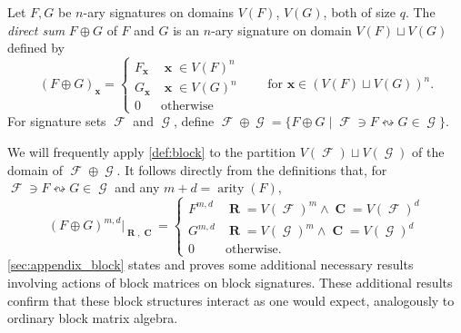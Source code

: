\documentclass{article}
\DeclareMathOperator{\arity}{arity}
\DeclareMathOperator{\vx}{\mathbf{x}}
\DeclareMathOperator{\vr}{\mathbf{R}}
\DeclareMathOperator{\vc}{\mathbf{C}}
\DeclareMathOperator{\fc}{\mathcal{F}}
\DeclareMathOperator{\gc}{\mathcal{G}}
\begin{document}
\begin{definition}[$\oplus$]
\label{def:oplus-f-g}
    Let $F,G$ be $n$-ary signatures on domains $V(F)$, $V(G)$, both of size $q$.
    The \emph{direct sum} $F \oplus G$ of $F$ and $G$ is an
    $n$-ary signature on domain $V(F) \sqcup V(G)$ defined by
    \[
        (F \oplus G)_{\vx} = \begin{cases} 
            F_{\vx} & \vx \in V(F)^n \\
            G_{\vx} & \vx \in V(G)^n \\
            0 & \text{otherwise}
        \end{cases}
        \qquad\text{for } \mathbf{x} \in (V(F) \sqcup V(G))^n.
    \]
    For signature sets $\fc$ and $\gc$, define 
    $\fc \oplus \gc = \{F \oplus G \mid \fc \ni F \leftrightsquigarrow G \in \gc\}$.
\end{definition}
We will frequently apply \autoref{def:block} to the partition $V(\fc) \sqcup V(\gc)$ of the domain
of $\fc\oplus\gc$.
It follows directly from the definitions that, for $\fc \ni F \leftrightsquigarrow G \in \gc$ and any 
$m+d = \arity(F)$,
\begin{equation}
    (F \oplus G)^{m,d}|_{\vr,\vc} = 
    \begin{cases}
        F^{m,d} & \vr = V(\fc)^m \wedge \vc = V(\fc)^d \\ G^{m,d} & \vr = V(\gc)^m \wedge \vc = V(\gc)^d \\ 0 & \text{otherwise}.
    \end{cases}
    \label{eq:oplus_index}
\end{equation}
\autoref{sec:appendix_block} states and proves some additional necessary results involving 
actions of block matrices on block signatures.
These additional results confirm that these block structures interact as
one would expect, analogously to ordinary block matrix algebra.

\end{document}

